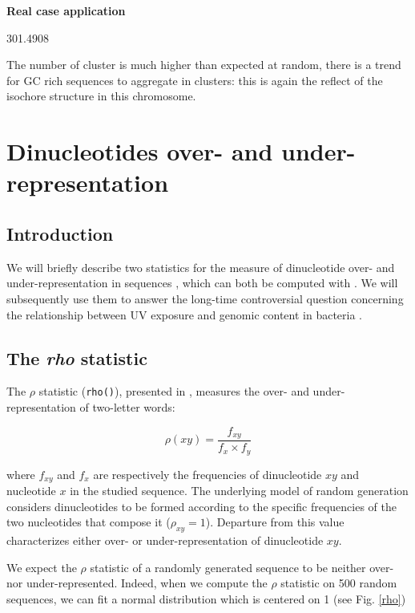 \documentclass{article}
\begin{document}
\noindent\textbf{Real case application}

\begin{Schunk}
\begin{Soutput}
[1] 301.4908
\end{Soutput}
\end{Schunk}

The number of cluster is much higher than expected at random, there is a trend for
GC rich sequences to aggregate in clusters: this is again the reflect of the isochore
structure in this chromosome.

\section{Dinucleotides over- and under-representation}
\label{dinu}

\subsection{Introduction}

We will briefly describe two statistics for the measure of
dinucleotide over- and under-representation in sequences
\cite{Karlin,UV}, which can both be computed with \seqinr{}. We will
subsequently use them to answer the long-time controversial question
concerning the relationship between UV exposure and genomic content in
bacteria \cite{Singer,Bak}.

\subsection{The \textit{rho} statistic}

The $\rho$ statistic (\texttt{rho()}), presented in \cite{Karlin},
measures the over- and under-representation of two-letter words:

$$\rho(xy) = \frac{f_{xy}}{f_{x}\times f_{y}}$$

where $f_{xy}$ and $f_{x}$ are respectively the frequencies of
dinucleotide $xy$ and nucleotide $x$ in the studied sequence. The
underlying model of random generation considers dinucleotides to be
formed according to the specific frequencies of the two nucleotides
that compose it ($\rho_{xy} = 1$). Departure from this value
characterizes either over- or under-representation of dinucleotide
$xy$.


We expect the $\rho$ statistic of a randomly generated sequence to be
neither over- nor under-represented. Indeed, when we compute the
$\rho$ statistic on 500 random
sequences, we can fit a normal distribution which is centered on 1
(see Fig. \ref{rho})
\end{document}
